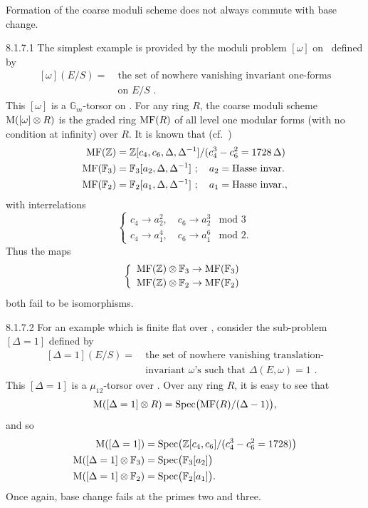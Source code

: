 \begin{krem}\label{rem:8.1.7}
Formation of the coarse moduli scheme does not always commute with base change.
\end{krem}

\begin{pitemnum}{8.1.7.1}\label{item:8.1.7.1}
The simplest example is provided by the moduli problem $[\omega]$ on \EllZ\ defined by
\[
\begin{aligned}
[\omega](E/S) =\ &\text{the set of nowhere vanishing invariant one-forms} \\
&\text{on $E/S$ .}
\end{aligned}
\]
This $[\omega]$ is a $\mathbb{G}_m$-torsor on \EllZ. For any ring $R$, the coarse moduli scheme $\mathrm{M}([\omega] \otimes R)$ is the graded ring $\mathrm{MF}(R)$ of all level one modular forms (with no condition at infinity) over $R$. It is known that (cf.\ \cite{De2})
\[
\begin{aligned}
\mathrm{MF}(\mathbb{Z}) &= \mathbb{Z}[c_4, c_6, \Delta, \Delta^{-1}]/(c_4^3 - c_6^2 = 1728\, \Delta) \\
\mathrm{MF}(\mathbb{F}_3) &= \mathbb{F}_3[a_2, \Delta, \Delta^{-1}] \ ; \quad a_2 = \text{Hasse invar.} \\
\mathrm{MF}(\mathbb{F}_2) &= \mathbb{F}_2[a_1, \Delta, \Delta^{-1}] \ ; \quad a_1 = \text{Hasse invar.} ,
\end{aligned}
\]
with interrelations
\[
\left\{
\begin{array}{ll}
c_4 \to a_2^2 , \quad c_6 \to a_2^3 & \text{mod } 3 \\[2pt]
c_4 \to a_1^4 , \quad c_6 \to a_1^6 & \text{mod } 2 .
\end{array}
\right.
\]
Thus the maps
\[
\left\{
\begin{array}{l}
\mathrm{MF}(\mathbb{Z}) \otimes \mathbb{F}_3 \to \mathrm{MF}(\mathbb{F}_3) \\[2pt]
\mathrm{MF}(\mathbb{Z}) \otimes \mathbb{F}_2 \to \mathrm{MF}(\mathbb{F}_2)
\end{array}
\right.
\]
both fail to be isomorphisms.
\end{pitemnum}

\begin{pitemnum}{8.1.7.2}\label{item:8.1.7.2}
For an example which is finite flat over \EllZ, consider the sub-problem $[\Delta = 1]$ defined by
\[
\begin{aligned}
[\Delta = 1](E/S) =\ &\text{the set of nowhere vanishing translation-} \\
&\text{invariant $\omega$'s such that $\Delta(E, \omega) = 1$ .}
\end{aligned}
\]
This $[\Delta = 1]$ is a $\mu_{12}$-torsor over \EllZ. Over any ring $R$, it is easy to see that
\[
\mathrm{M}([\Delta = 1] \otimes R) = \operatorname{Spec}\bigl(\mathrm{MF}(R)/(\Delta - 1)\bigr) ,
\]
and so
\[
\begin{aligned}
\mathrm{M}([\Delta = 1]) &= \operatorname{Spec}\bigl(\mathbb{Z}[c_4, c_6]/(c_4^3 - c_6^2 = 1728)\bigr) \\
\mathrm{M}([\Delta = 1] \otimes \mathbb{F}_3) &= \operatorname{Spec}\bigl(\mathbb{F}_3[a_2]\bigr) \\
\mathrm{M}([\Delta = 1] \otimes \mathbb{F}_2) &= \operatorname{Spec}\bigl(\mathbb{F}_2[a_1]\bigr) .
\end{aligned}
\]
Once again, base change fails at the primes two and three.
\end{pitemnum}

